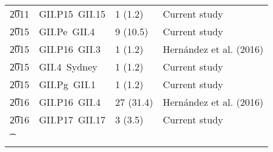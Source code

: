 \begin{table}[htbp]
\begin{tabular}{p{0.6cm}p{3.2cm}p{1.8cm}p{2.5cm}}
\t	2011 & GII.P15~GII.15 & 1 (1.2) & Current study \\
\t	2015 & GII.Pe~GII.4 & 9 (10.5) & Current study \\
\t	2015 & GII.P16~GII.3 & 1 (1.2) & Hernández et al. (2016) \\
\t	2015 & GII.4~Sydney & 1 (1.2) & Current study \\
\t	2015 & GII.Pg~GII.1 & 1 (1.2) & Current study \\
\t	2016 & GII.P16~GII.4 & 27 (31.4) & Hernández et al. (2016) \\
\t	2016 & GII.P17~GII.17 & 3 (3.5) & Current study \\
\t	\bottomrule
	\end{tabular}
	\label{tab:improved_norovirus_distribution}
\end{table}
